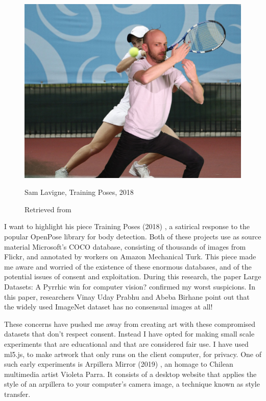 \begin{figure}[ht]
  \centering
    \includegraphics[width=0.75\linewidth,height=0.25\textheight,keepaspectratio]{images/sam-lavigne-training-poses.jpg}
  \caption{Sam Lavigne, Training Poses, 2018}
  \caption*{Retrieved from \cite{website-sam-lavigne-training-poses}}
  \label{fig:sam-lavigne-training-poses}
\end{figure}

I want to highlight his piece Training Poses (2018) \cite{website-sam-lavigne-training-poses}, a satirical response to the popular OpenPose \cite{website-openpose} library for body detection. Both of these projects use as source material Microsoft's \acrfull{COCO} database, consisting of thousands of images from Flickr, and annotated by workers on Amazon Mechanical Turk. This piece made me aware and worried of the existence of these enormous databases, and of the potential issues of consent and exploitation. During this research, the paper Large Datasets: A Pyrrhic win for computer vision? \cite{DBLP:journals/corr/abs-2006-16923} confirmed my worst suspicions. In this paper, researchers Vinay Uday Prabhu and Abeba Birhane point out that the widely used ImageNet dataset has no consensual images at all!

These concerns have pushed me away from creating art with these compromised datasets that don't respect consent. Instead I have opted for making small scale experiments that are educational and that are considered fair use. I have used ml5.js, to make artwork that only runs on the client computer, for privacy. One of such early experiments is Arpillera Mirror (2019) \cite{website-arpillera-mirror}, an homage to Chilean multimedia artist Violeta Parra. It consists of a desktop website that applies the style of an arpillera to your computer's camera image, a technique known as style transfer.

